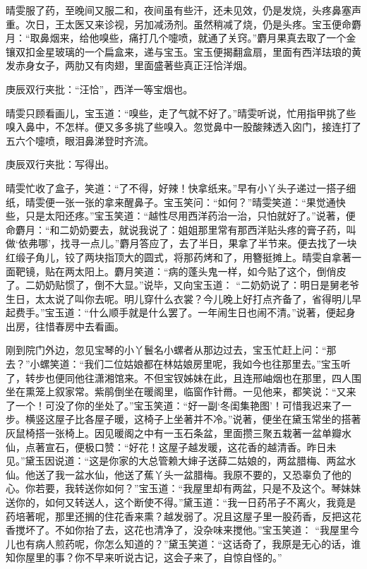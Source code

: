 \begin{parag}
    晴雯服了药，至晚间又服二和，夜间虽有些汗，还未见效，仍是发烧，头疼鼻塞声重。次日，王太医又来诊视，另加减汤剂。虽然稍减了烧，仍是头疼。宝玉便命麝月：“取鼻烟来，给他嗅些，痛打几个嚏喷，就通了关窍。”麝月果真去取了一个金镶双扣金星玻璃的一个扁盒来，递与宝玉。宝玉便揭翻盒扇，里面有西洋珐琅的黄发赤身女子，两肋又有肉翅，里面盛著些真正汪恰洋烟。\begin{note}庚辰双行夹批：“汪恰”，西洋一等宝烟也。\end{note}晴雯只顾看画儿，宝玉道：“嗅些，走了气就不好了。”晴雯听说，忙用指甲挑了些嗅入鼻中，不怎样。便又多多挑了些嗅入。忽觉鼻中一股酸辣透入囟门，接连打了五六个嚏喷，眼泪鼻涕登时齐流。\begin{note}庚辰双行夹批：写得出。\end{note}晴雯忙收了盒子，笑道：“了不得，好辣！快拿纸来。”早有小丫头子递过一搭子细纸，晴雯便一张一张的拿来醒鼻子。宝玉笑问：“如何？”晴雯笑道：“果觉通快些，只是太阳还疼。”宝玉笑道：“越性尽用西洋药治一治，只怕就好了。”说著，便命麝月：“和二奶奶要去，就说我说了：姐姐那里常有那西洋贴头疼的膏子药，叫做‘依弗哪’，找寻一点儿。”麝月答应了，去了半日，果拿了半节来。便去找了一块红缎子角儿，铰了两块指顶大的圆式，将那药烤和了，用簪挺摊上。晴雯自拿著一面靶镜，贴在两太阳上。麝月笑道：“病的蓬头鬼一样，如今贴了这个，倒俏皮了。二奶奶贴惯了，倒不大显。”说毕，又向宝玉道： “二奶奶说了：明日是舅老爷生日，太太说了叫你去呢。明儿穿什么衣裳？今儿晚上好打点齐备了，省得明儿早起费手。”宝玉道：“什么顺手就是什么罢了。一年闹生日也闹不清。”说著，便起身出房，往惜春房中去看画。
\end{parag}


\begin{parag}
    刚到院门外边，忽见宝琴的小丫鬟名小螺者从那边过去，宝玉忙赶上问：“那去？”小螺笑道：“我们二位姑娘都在林姑娘房里呢，我如今也往那里去。”宝玉听了，转步也便同他往潇湘馆来。不但宝钗姊妹在此，且连邢岫烟也在那里，四人围坐在熏笼上叙家常。紫鹃倒坐在暖阁里，临窗作针黹。一见他来，都笑说：“又来了一个！可没了你的坐处了。”宝玉笑道：“好一副‘冬闺集艳图’！可惜我迟来了一步。横竖这屋子比各屋子暖，这椅子上坐著并不冷。”说著，便坐在黛玉常坐的搭著灰鼠椅搭一张椅上。因见暖阁之中有一玉石条盆，里面攒三聚五栽著一盆单瓣水仙，点著宣石，便极口赞：“好花！这屋子越发暖，这花香的越清香。昨日未见。”黛玉因说道：“这是你家的大总管赖大婶子送薛二姑娘的，两盆腊梅、两盆水仙。他送了我一盆水仙，他送了蕉丫头一盆腊梅。我原不要的，又恐辜负了他的心。你若要，我转送你如何？”宝玉道：“我屋里却有两盆，只是不及这个。琴妹妹送你的，如何又转送人，这个断使不得。”黛玉道：“我一日药吊子不离火，我竟是药培著呢，那里还搁的住花香来熏？越发弱了。况且这屋子里一股药香，反把这花香搅坏了。不如你抬了去，这花也清净了，没杂味来搅他。”宝玉笑道： “我屋里今儿也有病人煎药呢，你怎么知道的？”黛玉笑道：“这话奇了，我原是无心的话，谁知你屋里的事？你不早来听说古记，这会子来了，自惊自怪的。”
\end{parag}


